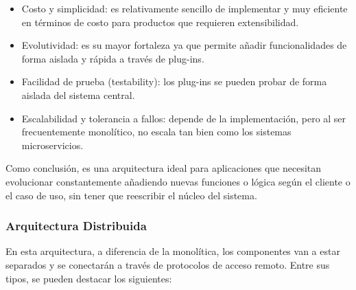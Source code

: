 \begin{itemize}
    \begin{itemize}
        \item Costo y simplicidad: es relativamente sencillo de implementar y muy eficiente en términos de costo para 
        productos que requieren extensibilidad.
        \item Evolutividad: es su mayor fortaleza ya que permite añadir funcionalidades de forma aislada y rápida a través 
        de plug-ins.
        \item Facilidad de prueba (testability): los plug-ins se pueden probar de forma aislada del sistema central.
        \item Escalabilidad y tolerancia a fallos: depende de la implementación, pero al ser frecuentemente monolítico, 
        no escala tan bien como los sistemas microservicios.
    \end{itemize}

    Como conclusión, es una arquitectura ideal para aplicaciones que necesitan evolucionar constantemente añadiendo nuevas 
    funciones o lógica según el cliente o el caso de uso, sin tener que reescribir el núcleo del sistema.

\end{itemize}

\subsubsection{Arquitectura Distribuida}

En esta arquitectura, a diferencia de la monolítica, los componentes van a estar separados y se conectarán a través de 
protocolos de acceso remoto.
Entre sus tipos, se pueden destacar los siguientes:

